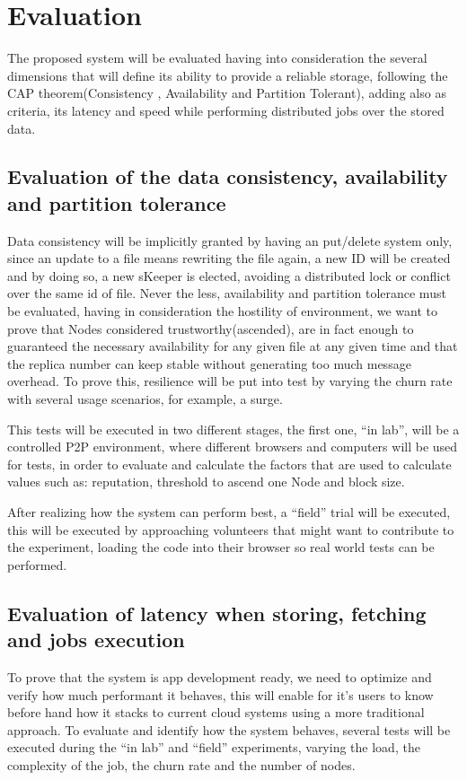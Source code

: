
% 
% 

\section{Evaluation}

The proposed system will be evaluated having into consideration the several dimensions that will define its ability to provide a reliable storage, following the CAP theorem(Consistency , Availability and Partition Tolerant), adding also as criteria, its latency and speed while performing distributed jobs over the stored data.

\subsection{Evaluation of the data consistency, availability and partition tolerance}

Data consistency will be implicitly granted by having an put/delete system only, since an update to a file means rewriting the file again, a new ID will be created and by doing so, a new sKeeper is elected, avoiding a distributed lock or conflict over the same id of file. Never the less, availability and partition tolerance must be evaluated, having in consideration the hostility of environment, we want to prove that Nodes considered trustworthy(ascended), are in fact enough to guaranteed the necessary availability for any given file at any given time and that the replica number can keep stable without generating too much message overhead. To prove this, resilience will be put into test by varying the churn rate with several usage scenarios, for example, a surge.

This tests will be executed in two different stages, the first one, ``in lab'', will be a controlled P2P environment, where different browsers and computers will be used for tests, in order to evaluate and calculate the factors that are used to calculate values such as: reputation, threshold to ascend one Node and block size. 

After realizing how the system can perform best, a ``field'' trial will be executed, this will be executed by approaching volunteers that might want to contribute to the experiment, loading the code into their browser so real world tests can be performed.

\subsection{Evaluation of latency when storing, fetching and jobs execution}

To prove that the system is app development ready, we need to optimize and verify how much performant it behaves, this will enable for it's users to know before hand how it stacks to current cloud systems using a more traditional approach. To evaluate and identify how the system behaves, several tests will be executed during the ``in lab'' and ``field'' experiments, varying the load, the complexity of the job, the churn rate and the number of nodes.